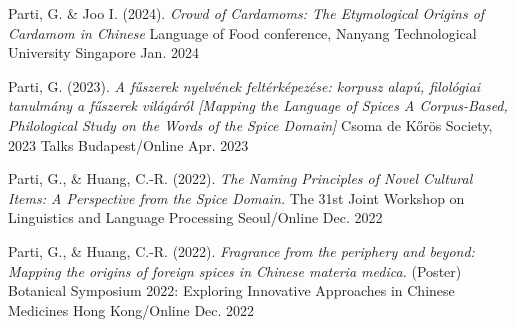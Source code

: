 
\begin{cventries}

  \cventry
  {Parti, G. \& Joo I. (2024). \textit{Crowd of Cardamoms: The Etymological Origins of Cardamom in Chinese}} %
  {Language of Food conference, Nanyang Technological University \href{https://www.ntu.edu.sg/soh/news-events/events/detail/2024/01/29/research-events/the-language-of-food-exploring-culinary-communication-and-culture}{\faExternalLink}} %
  {Singapore} %
  {Jan. 2024} %
  {
  }

  

  \cventry
  {Parti, G. (2023). \textit{A fűszerek nyelvének feltérképezése: korpusz alapú, filológiai tanulmány a fűszerek világáról [Mapping the Language of Spices A Corpus-Based, Philological Study on the Words of the Spice Domain]}} %
  {Csoma de Kőrös Society, 2023 Talks \href{https://www.youtube.com/watch?v=udy1Hrn0wc0}{\faExternalLink}} %
  {Budapest/Online} %
  {Apr. 2023} %
  {
  }

  \cventry
    {Parti, G., \& Huang, C.-R. (2022). \textit{The Naming Principles of Novel Cultural Items: A Perspective from the Spice Domain.}} %
    {The 31st Joint Workshop on Linguistics and Language Processing \href{https://jwllp31.github.io/program/}{\faExternalLink}} %
    {Seoul/Online} %
    {Dec. 2022} %
    {
    }


  \cventry
    {Parti, G., \& Huang, C.-R. (2022). \textit{Fragrance from the periphery and beyond: Mapping the origins of foreign spices in Chinese materia medica.} (Poster)} %
    {Botanical Symposium 2022: Exploring Innovative Approaches in Chinese Medicines \href{https://event.fourwaves.com/botanicalsymposium2022/abstracts/1ea06222-f8a6-400c-8c92-de4e419a56f3}{\faExternalLink}} %
    {Hong Kong/Online} %
    {Dec. 2022} %
    {
    }

\end{cventries}
